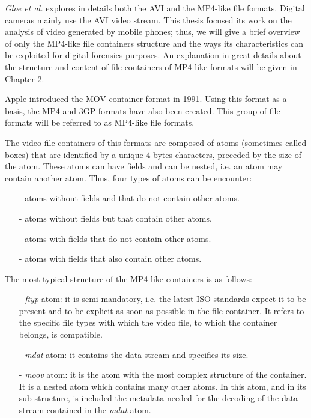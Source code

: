 \emph{Gloe et al.} \cite{Gloe2014S68} explores in details both the AVI \cite{avi} and the MP4-like file formats. Digital cameras mainly use the AVI video stream. This thesis focused its work on the analysis of video generated by mobile phones; thus, we will give a brief overview of only the MP4-like file containers structure and the ways its characteristics can be exploited for digital forensics purposes. An explanation in great details about the structure and content of file containers of MP4-like formats will be given in Chapter 2.

Apple introduced the MOV \cite{mov} container format in 1991. Using this format as a basis, the MP4 \cite{mp4} and 3GP formats have also been created. This group of file formats will be referred to as MP4-like file formats.

The video file containers of this formats are composed of atoms (sometimes called boxes) that are identified by a unique 4 bytes characters, preceded by the size of the atom. These atoms can have fields and can be nested, i.e. an atom may contain another atom. Thus, four types of atoms can be encounter:
\begin{itemize}
\item[-] atoms without fields and that do not contain other atoms.
\item[-] atoms without fields but that contain other atoms.
\item[-] atoms with fields that do not contain other atoms.
\item[-] atoms with fields that also contain other atoms.
\end{itemize}

The most typical structure of the MP4-like containers is as follows:
\begin{itemize}
\item[-] \emph{ftyp} atom: it is semi-mandatory, i.e. the latest ISO standards expect it to be present and to be explicit as soon as possible in the file container. It refers to the specific file types with which the video file, to which the container belongs, is compatible.
\item[-] \emph{mdat} atom: it contains the data stream and specifies its size.
\item[-] \emph{moov} atom: it is the atom with the most complex structure of the container. It is a nested atom which contains many other atoms. In this atom, and in its sub-structure, is included the metadata needed for the decoding of the data stream contained in the \emph{mdat} atom.
\end{itemize}

